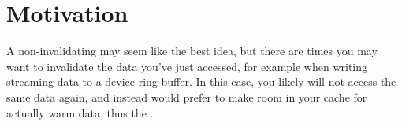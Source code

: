 \section{Motivation}
\label{sec:motivation}


A non-invalidating \wb{} may seem like the best idea, but there are times you may want to invalidate the data you've just accessed, for example when writing streaming data to a device ring-buffer.
In this case, you likely will not access the same data again, and instead would prefer to make room in your cache for actually warm data, thus the \fl{}.